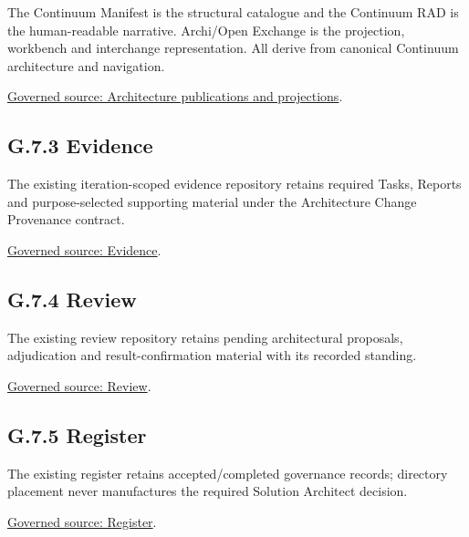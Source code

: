 The Continuum Manifest is the structural catalogue and the Continuum RAD is the human-readable narrative. Archi/Open Exchange is the projection, workbench and interchange representation. All derive from canonical Continuum architecture and navigation.\par
\href{../../../README.md}{Governed source: Architecture publications and projections}.\par
\subsection*{G.7.3 Evidence}
\label{navigation:G.7.3}

The existing iteration-scoped evidence repository retains required Tasks, Reports and purpose-selected supporting material under the Architecture Change Provenance contract.\par
\href{../../../../design/evidence}{Governed source: Evidence}.\par
\subsection*{G.7.4 Review}
\label{navigation:G.7.4}

The existing review repository retains pending architectural proposals, adjudication and result-confirmation material with its recorded standing.\par
\href{../../../../design/review}{Governed source: Review}.\par
\subsection*{G.7.5 Register}
\label{navigation:G.7.5}

The existing register retains accepted/completed governance records; directory placement never manufactures the required Solution Architect decision.\par
\href{../../../../design/register}{Governed source: Register}.\par
